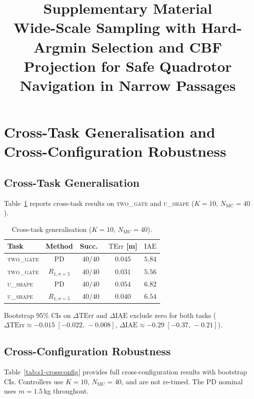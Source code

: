 \documentclass[11pt,a4paper]{article}
\newcommand{\Nm}{N_{\mathrm{MC}}}
\newcommand{\TErr}{\mathrm{TErr}}
\newcommand{\IAE}{\mathrm{IAE}}
\begin{document}
\title{\textbf{Supplementary Material}\\[4pt]
\large Wide-Scale Sampling with Hard-Argmin Selection and CBF Projection
for Safe Quadrotor Navigation in Narrow Passages}

\date{}
\maketitle

\section{Cross-Task Generalisation and Cross-Configuration Robustness}
\label{sec:S1}

\subsection{Cross-Task Generalisation}

Table~\ref{tab:s1-cross} reports cross-task results on
\textsc{two\_gate} and \textsc{u\_shape} ($K = 10$, $\Nm = 40$).

\begin{table}[h]
\centering
\caption{Cross-task generalisation ($K = 10$, $\Nm = 40$).}\label{tab:s1-cross}
\begin{tabular}{lcccc}
\toprule
Task & Method & Succ.\ & $\TErr$ [m] & $\IAE$ \\
\midrule
\textsc{two\_gate} & PD & $40/40$ & $0.045$ & $5.84$ \\
\textsc{two\_gate} & $R_{1,\sigma=5}$ & $40/40$ & $0.031$ & $5.56$ \\
\textsc{u\_shape} & PD & $40/40$ & $0.054$ & $6.82$ \\
\textsc{u\_shape} & $R_{1,\sigma=5}$ & $40/40$ & $0.040$ & $6.54$ \\
\bottomrule
\end{tabular}
\par\smallskip
Bootstrap 95\% CIs on $\Delta\TErr$ and $\Delta\IAE$ exclude zero
for both tasks ($\Delta\TErr \approx -0.015\;[-0.022,\,-0.008]$,
$\Delta\IAE \approx -0.29\;[-0.37,\,-0.21]$).
\end{table}

\subsection{Cross-Configuration Robustness}

Table~\ref{tab:s1-crossconfig} provides full cross-configuration
results with bootstrap CIs. Controllers use $K = 10$, $\Nm = 40$, and
are not re-tuned. The PD nominal uses $m = 1.5$\,kg throughout.
\end{document}
